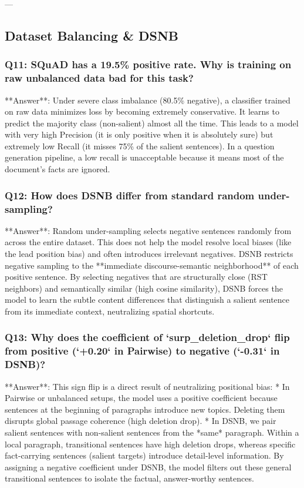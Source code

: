 \documentclass[11pt,a4paper]{article}
\begin{document}
---

\subsection{Dataset Balancing \& DSNB}

\subsubsection{Q11: SQuAD has a 19.5\% positive rate. Why is training on raw unbalanced data bad for this task?}
**Answer**: Under severe class imbalance (80.5\% negative), a classifier trained on raw data minimizes loss by becoming extremely conservative. It learns to predict the majority class (non-salient) almost all the time. 
This leads to a model with very high Precision (it is only positive when it is absolutely sure) but extremely low Recall (it misses 75\% of the salient sentences). In a question generation pipeline, a low recall is unacceptable because it means most of the document's facts are ignored.

\subsubsection{Q12: How does DSNB differ from standard random under-sampling?}
**Answer**: Random under-sampling selects negative sentences randomly from across the entire dataset. This does not help the model resolve local biases (like the lead position bias) and often introduces irrelevant negatives. 
DSNB restricts negative sampling to the **immediate discourse-semantic neighborhood** of each positive sentence. By selecting negatives that are structurally close (RST neighbors) and semantically similar (high cosine similarity), DSNB forces the model to learn the subtle content differences that distinguish a salient sentence from its immediate context, neutralizing spatial shortcuts.

\subsubsection{Q13: Why does the coefficient of `surp\_deletion\_drop` flip from positive (`+0.20` in Pairwise) to negative (`-0.31` in DSNB)?}
**Answer**: This sign flip is a direct result of neutralizing positional bias:
* In Pairwise or unbalanced setups, the model uses a positive coefficient because sentences at the beginning of paragraphs introduce new topics. Deleting them disrupts global passage coherence (high deletion drop).
* In DSNB, we pair salient sentences with non-salient sentences from the *same* paragraph. Within a local paragraph, transitional sentences have high deletion drops, whereas specific fact-carrying sentences (salient targets) introduce detail-level information. By assigning a negative coefficient under DSNB, the model filters out these general transitional sentences to isolate the factual, answer-worthy sentences.
\end{document}
